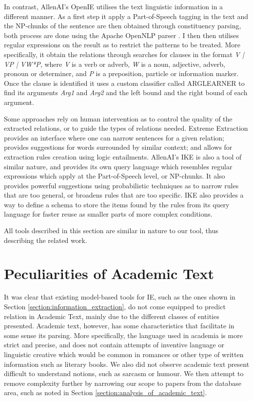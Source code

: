 \documentclass[11pt,a4paper,openright]{memoir}
\begin{document}
In contrast, AllenAI's OpenIE \cite{Etzioni:2011:OIE:2283396.2283398} utilises the text linguistic information in a different manner. As a first step it apply a Part-of-Speech tagging in the text and the NP-chunks of the sentence are then obtained through constituency parsing, both process are done using the Apache OpenNLP parser \cite{open-nlp}. I then then utilises regular expressions on the result as to restrict the patterns to be treated. More specifically, it obtain the relations through searches for clauses in the format \emph{V | VP | VW*P}, where \emph{V} is a verb or adverb, \emph{W} is a noun, adjective, adverb, pronoun or determiner, and \emph{P} is a preposition, particle or information marker. Once the clause is identified it uses a custom classifier called ARGLEARNER to find its arguments \emph{Arg1} and \emph{Arg2} and the left bound and the right bound of each argument.

Some approaches rely on human intervention as to control the quality of the extracted relations, or to guide the types of relations needed. Extreme Extraction \cite{DBLP:journals/corr/HoffmannZW15} provides an interface where one can narrow sentences for a given relation; provides suggestions for words surrounded by similar context; and allows for extraction rules creation using logic entailments. AllenAI's IKE \cite{DBLP:conf/akbc/DalviBCCEFG16} is also a tool of similar nature, and provides its own query language which resembles regular expressions which apply at the Part-of-Speech level, or NP-chunks. It also provides powerful suggestions using probabilistic techniques as to narrow rules that are too general, or broadens rules that are too specific. IKE also provides a way to define a schema to store the items found by the rules from its query language for faster reuse as smaller parts of more complex conditions.

All tools described in this section are similar in nature to our tool, thus describing the related work.


%
%
%
%


\section{Peculiarities of Academic Text}

It was clear that existing model-based tools for IE, such as the ones shown in Section \ref{section:information_extraction}, do not come equipped to predict relation in Academic Text, mainly due to the different classes of entities presented. Academic text, however, has some characteristics that facilitate in some sense its parsing. More specifically, the language used in academia is more strict and precise, and does not contain attempts of inventive language or linguistic creative which would be common in romances or other type of written information such as literary books. We also did not observe academic text present difficult to understand notions, such as sarcasm or humour. We then attempt to remove complexity further by narrowing our scope to papers from the database area, such as noted in Section \ref{section:analysis_of_academic_text}.
\end{document}
